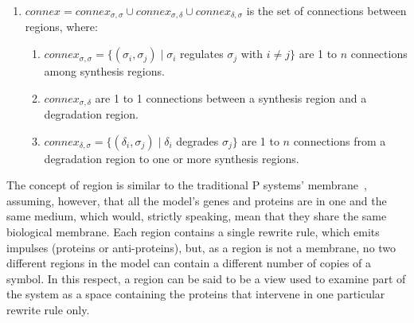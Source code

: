 \documentclass[runningheads,a4paper]{llncs}
\newcommand{\connex}{\mathit{connex}}
\begin{document}
\begin{enumerate}
\begin{enumerate}
      \end{enumerate}
    \item $\connex =\connex_{\sigma,\sigma} \cup \connex_{\sigma,\delta} \cup\connex_{\delta,\sigma}$ is the set of connections between regions, where:
      \begin{enumerate}
        \item $\connex_{\sigma,\sigma} = \{(\sigma_i, \sigma_j)\;|\;\sigma_i$
          regulates $\sigma_j$ with $i \neq j \}$ are 1 to $n$ connections among synthesis regions.
        \item $\connex_{\sigma,\delta}$ are 1 to 1 connections between a
          synthesis region and a degradation region.
        \item $\connex_{\delta,\sigma} = \{(\delta_i, \sigma_j)\;|\;\delta_i$ 
          degrades $\sigma_j\}$ are 1 to $n$ connections from a degradation region to one or more synthesis regions.
      \end{enumerate}
  \end{enumerate}

  \color{black}

  The concept of region is similar to the traditional P systems'
  membrane~\cite{Paun2000}, assuming, however, that all the model's genes and
  proteins are in one and the same medium, which would, strictly speaking, mean
  that they share the same biological membrane. Each region contains a single rewrite
  rule, which emits impulses (proteins or anti-proteins), but, as a region is
  not a membrane, no two different regions in the model can contain a different
  number of copies of a symbol. In this respect, a region can be said to be a
  view used to examine part of the system as a space containing the proteins
  that intervene in one particular rewrite rule only.
\end{document}
